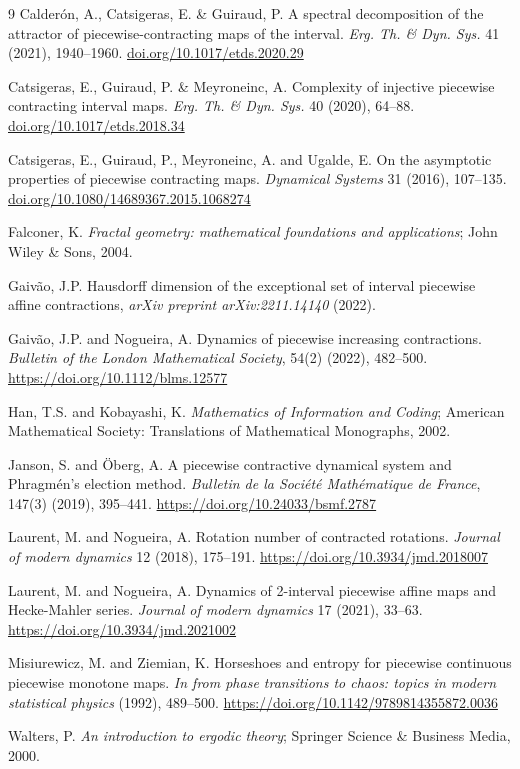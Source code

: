 \documentclass[a4paper]{article}
\begin{document}
\begin{thebibliography}{9}
 Calder\'on, A., Catsigeras, E. \& Guiraud, P. A spectral decomposition of the attractor of piecewise-contracting maps of the interval. {\it Erg. Th. \& Dyn. Sys.} {41} (2021), 1940--1960. \href{https://doi.org/10.1017/etds.2020.29}{doi.org/10.1017/etds.2020.29}

 Catsigeras, E., Guiraud, P. \& Meyroneinc, A. Complexity of injective piecewise contracting interval maps. {\it Erg. Th. \& Dyn. Sys.} {40} (2020), 64--88. \href{https://doi.org/10.1017/etds.2018.34}{doi.org/10.1017/etds.2018.34}

 Catsigeras, E., Guiraud, P., Meyroneinc, A. and Ugalde, E. On the asymptotic properties of piecewise contracting maps. {\em Dynamical Systems} {31} (2016), 107--135. \href{https://doi.org/10.1080/14689367.2015.1068274}{doi.org/10.1080/14689367.2015.1068274}

 Falconer, K. \textit{Fractal geometry: mathematical foundations and applications}; John Wiley \& Sons, 2004.

 Gaivão, J.P. Hausdorff dimension of the exceptional set of interval piecewise affine contractions, {\it arXiv preprint arXiv:2211.14140} (2022).

 Gaivão, J.P. and Nogueira, A. Dynamics of piecewise increasing contractions. {\it Bulletin of the London Mathematical Society}, 54(2) (2022), 482--500. \href{https://doi.org/10.1112/blms.12577}{https://doi.org/10.1112/blms.12577}

 Han, T.S. and Kobayashi, K. \textit{Mathematics of Information and Coding}; American Mathematical Society: Translations of Mathematical Monographs, 2002.

 Janson, S. and Öberg, A. A piecewise contractive dynamical system and Phragmén’s election method. {\it Bulletin de la Société Mathématique de France}, 147(3) (2019), 395--441. \href{https://doi.org/10.24033/bsmf.2787}{https://doi.org/10.24033/bsmf.2787}


 Laurent, M. and Nogueira, A. Rotation number of contracted rotations. {\it Journal of modern dynamics} 12 (2018), 175--191. \href{https://doi.org/10.3934/jmd.2018007}{https://doi.org/10.3934/jmd.2018007}


 Laurent, M. and Nogueira, A. Dynamics of 2-interval piecewise affine maps and Hecke-Mahler series. {\it Journal of modern dynamics} 17 (2021), 33--63. \href{https://doi.org/10.3934/jmd.2021002}{https://doi.org/10.3934/jmd.2021002}

 Misiurewicz, M. and Ziemian, K. Horseshoes and entropy for piecewise continuous piecewise monotone maps. \textit{In from phase transitions to chaos: topics in modern statistical physics} (1992), 489--500. \href{https://doi.org/10.1142/9789814355872_0036}{https://doi.org/10.1142/9789814355872.0036}

 Walters, P. \textit{An introduction to ergodic theory}; Springer Science \& Business Media, 2000.
\end{thebibliography}
\end{document}
